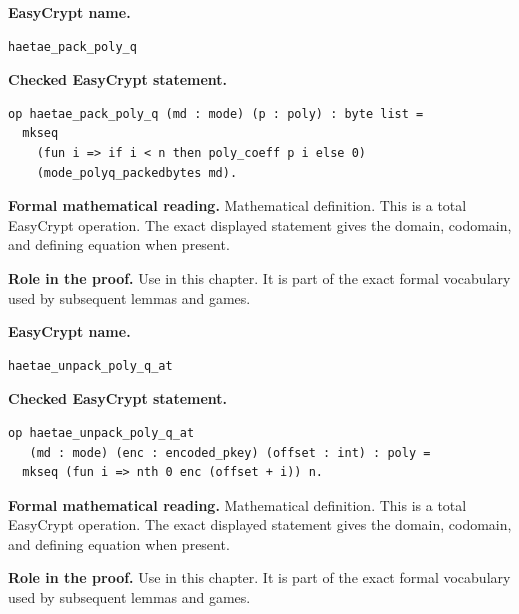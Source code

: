 \begin{formaldefinition}
\noindent\textbf{EasyCrypt name.}
\begin{lstlisting}[language=EasyCrypt,basicstyle=\ttfamily\scriptsize]
haetae_pack_poly_q
\end{lstlisting}
\noindent\textbf{Checked EasyCrypt statement.}
\begin{lstlisting}[language=EasyCrypt,basicstyle=\ttfamily\scriptsize]
op haetae_pack_poly_q (md : mode) (p : poly) : byte list =
  mkseq
    (fun i => if i < n then poly_coeff p i else 0)
    (mode_polyq_packedbytes md).
\end{lstlisting}
\noindent\textbf{Formal mathematical reading.}
Mathematical definition. This is a total EasyCrypt operation.  The exact displayed statement gives the domain, codomain, and defining equation when present.

\noindent\textbf{Role in the proof.}
Use in this chapter. It is part of the exact formal vocabulary used by subsequent lemmas and games.

\end{formaldefinition}

\begin{formaldefinition}
\noindent\textbf{EasyCrypt name.}
\begin{lstlisting}[language=EasyCrypt,basicstyle=\ttfamily\scriptsize]
haetae_unpack_poly_q_at
\end{lstlisting}
\noindent\textbf{Checked EasyCrypt statement.}
\begin{lstlisting}[language=EasyCrypt,basicstyle=\ttfamily\scriptsize]
op haetae_unpack_poly_q_at
   (md : mode) (enc : encoded_pkey) (offset : int) : poly =
  mkseq (fun i => nth 0 enc (offset + i)) n.
\end{lstlisting}
\noindent\textbf{Formal mathematical reading.}
Mathematical definition. This is a total EasyCrypt operation.  The exact displayed statement gives the domain, codomain, and defining equation when present.

\noindent\textbf{Role in the proof.}
Use in this chapter. It is part of the exact formal vocabulary used by subsequent lemmas and games.

\end{formaldefinition}

